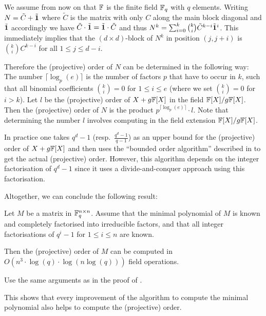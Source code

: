 We assume from now on that $\mathbb{F}$ is the finite field $\mathbb{F}_q$ with $q$
elements.
Writing $N = \tilde C + \tilde {\mathbf{1}}$ where $\tilde C$ is the matrix
with only $C$ along the main block diagonal and $\tilde {\mathbf{1}}$
accordingly we have $\tilde C \cdot \tilde {\mathbf{1}} = \tilde {\mathbf{1}} \cdot \tilde C$
and thus $N^k = \sum_{i=0}^k {k \choose i} \tilde C^{k-i} \tilde
{\mathbf{1}}^i$. This immediately implies that the $(d \times d)$-block
of $N^k$ in position $(j,j+i)$ is ${k \choose i}C^{k-i}$ for all
$1 \le j \le d-i$. 

Therefore the (projective) order of $N$ can be determined in the
following way: The number $\lceil \log_p(e)\rceil$ is the number
of factors $p$ that have to occur in $k$, such that all binomial
coefficients ${k \choose i} = 0$ for $1 \le i \le e$ (where we set ${k
\choose i} = 0$ for $i > k$). Let $l$ be the (projective) order of
$X+g\mathbb{F}[X]$ in the field $\mathbb{F}[X]/g\mathbb{F}[X]$. Then the (projective) order of
$N$ is the product $p^{\lceil \log_p(e) \rceil} \cdot l$. Note that
determining the number $l$ involves computing in the field extension
$\mathbb{F}[X]/g\mathbb{F}[X]$.

In practice one takes $q^d-1$ (resp.~$\frac{q^d-1}{q-1}$) as an upper bound
for the (projective) order of $X+g\mathbb{F}[X]$ and then uses the ``bounded order
algorithm'' described in \cite[Section 2]{CellLeedOrder} to get the
actual (projective) order. However, this algorithm depends on the
integer factorisation of $q^d-1$ since it uses a divide-and-conquer
approach using this factorisation.

Altogether, we can conclude the following result:

\begin{Prop}
Let $M$ be a matrix in $\mathbb{F}_q^{n \times n}$. Assume that the 
minimal polynomial of $M$ is known and completely factorised into
irreducible factors, and that all integer factorisations of $q^i-1$
for $1 \le i \le n$ are known. 

Then the (projective) order of $M$ can be
computed in $O(n^3 \cdot \log(q) \cdot \log(n\log(q)))$
field operations.
\end{Prop}
\proofbeg Use the same arguments as in the proof of 
\cite[\textsc{Order Algorithm}]{CellLeedOrder}. 
\proofend

\begin{Rem}
This shows that every improvement of the algorithm to compute the
minimal polynomial also helps to compute the (projective) order.
\end{Rem}

